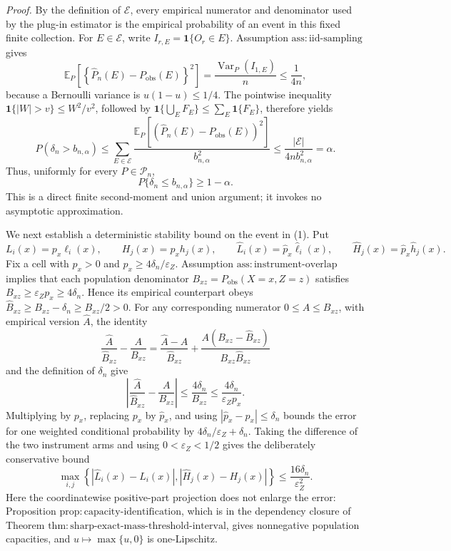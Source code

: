 \noindent\textit{Proof.}
By the definition of \(\mathcal E\), every empirical numerator and
denominator used by the plug-in estimator is the empirical probability
of an event in this fixed finite collection.  For \(E\in\mathcal E\),
write \(I_{r,E}=\mathbf 1\{O_r\in E\}\).  Assumption
\(\mathrm{ass{:}iid\text{-}sampling}\) gives
\[
\mathbb E_P\!\left[
 \left\{\widehat P_n(E)-P_{\mathrm{obs}}(E)\right\}^{2}
 \right]
=\frac{\operatorname{Var}_P(I_{1,E})}{n}
\le \frac{1}{4n},
\]
because a Bernoulli variance is \(u(1-u)\le1/4\).  The pointwise
inequality \(\mathbf 1\{|W|>v\}\le W^2/v^2\), followed by
\(\mathbf 1\{\bigcup_E F_E\}\le\sum_E\mathbf 1\{F_E\}\), therefore
yields
\[
P(\delta_n>b_{n,\alpha})
\le \sum_{E\in\mathcal E}
 \frac{\mathbb E_P[(\widehat P_n(E)-P_{\mathrm{obs}}(E))^2]}
      {b_{n,\alpha}^2}
\le\frac{|\mathcal E|}{4n b_{n,\alpha}^2}=\alpha.
\]
Thus, uniformly for every \(P\in\mathcal P_n\),
\[
P\{\delta_n\le b_{n,\alpha}\}\ge1-\alpha.
\tag{1}
\]
This is a direct finite second-moment and union argument; it invokes no
asymptotic approximation.

We next establish a deterministic stability bound on the event in
(1).  Put
\[
L_i(x)=p_x\ell_i(x),\qquad H_j(x)=p_xh_j(x),\qquad
\widehat L_i(x)=\widehat p_x\widehat\ell_i(x),\qquad
\widehat H_j(x)=\widehat p_x\widehat h_j(x).
\]
Fix a cell with \(p_x>0\) and
\(p_x\ge4\delta_n/\varepsilon_Z\).  Assumption
\(\mathrm{ass{:}instrument\text{-}overlap}\) implies that each
population denominator
\(B_{xz}=P_{\mathrm{obs}}(X=x,Z=z)\) satisfies
\(B_{xz}\ge\varepsilon_Zp_x\ge4\delta_n\).  Hence its empirical
counterpart obeys \(\widehat B_{xz}\ge B_{xz}-\delta_n\ge B_{xz}/2>0\).
For any corresponding numerator \(0\le A\le B_{xz}\), with empirical
version \(\widehat A\), the identity
\[
\frac{\widehat A}{\widehat B_{xz}}-\frac{A}{B_{xz}}
=\frac{\widehat A-A}{\widehat B_{xz}}
+\frac{A(B_{xz}-\widehat B_{xz})}
        {B_{xz}\widehat B_{xz}}
\]
and the definition of \(\delta_n\) give
\[
\left|\frac{\widehat A}{\widehat B_{xz}}-
             \frac{A}{B_{xz}}\right|
\le\frac{4\delta_n}{B_{xz}}
\le\frac{4\delta_n}{\varepsilon_Zp_x}.
\tag{2}
\]
Multiplying by \(p_x\), replacing \(p_x\) by \(\widehat p_x\), and
using \(|\widehat p_x-p_x|\le\delta_n\) bounds the error for one
weighted conditional probability by \(4\delta_n/\varepsilon_Z+\delta_n\).
Taking the difference of the two instrument arms and using
\(0<\varepsilon_Z<1/2\) gives the deliberately conservative bound
\[
\max_{i,j}\left\{|\widehat L_i(x)-L_i(x)|,
                    |\widehat H_j(x)-H_j(x)|\right\}
\le\frac{16\delta_n}{\varepsilon_Z^2}.
\tag{3}
\]
Here the coordinatewise positive-part projection does not enlarge the
error: Proposition \(\mathrm{prop{:}capacity\text{-}identification}\),
which is in the dependency closure of Theorem
\(\mathrm{thm{:}sharp\text{-}exact\text{-}mass\text{-}threshold\text{-}interval}\),
gives nonnegative population capacities, and \(u\mapsto\max\{u,0\}\)
is one-Lipschitz.


